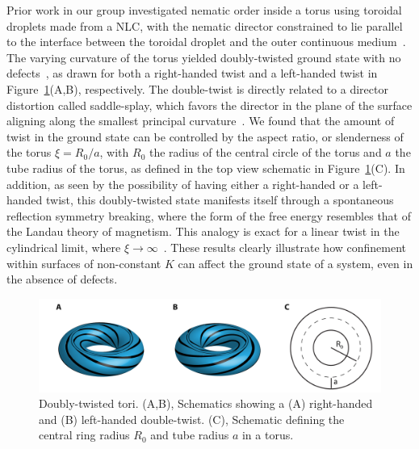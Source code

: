 Prior work in our group investigated nematic order inside a torus using toroidal droplets made from a NLC, with the nematic director constrained to lie parallel to the interface between the toroidal droplet and the outer continuous medium~\cite{RN24,RN47}.
The varying curvature of the torus yielded doubly-twisted ground state with no defects~\cite{RN24}, as drawn for both a right-handed twist and a left-handed twist in Figure~\ref{f:1-Torus}(A,B), respectively.
The double-twist is directly related to a director distortion called saddle-splay, which favors the director in the plane of the surface aligning along the smallest principal curvature~\cite{RN59}.
We found that the amount of twist in the ground state can be controlled by the aspect ratio, or slenderness of the torus $\xi = R_0/a$, with $R_0$ the radius of the central circle of the torus and $a$ the tube radius of the torus, as defined in the top view schematic in Figure~\ref{f:1-Torus}(C).
In addition, as seen by the possibility of having either a right-handed or a left-handed twist, this doubly-twisted state manifests itself through a spontaneous reflection symmetry breaking, where the form of the free energy resembles that of the Landau theory of magnetism.
This analogy is exact for a linear twist in the cylindrical limit, where $\xi \rightarrow \infty$~\cite{RN293}.
These results clearly illustrate how confinement within surfaces of non-constant $K$ can affect the ground state of a system, even in the absence of defects.
\begin{figure}
  \centering
  \includegraphics{figures/C1/Ch1-Figs_Torus.png}
  \caption{Doubly-twisted tori.
  (A,B), Schematics showing a (A) right-handed and (B) left-handed double-twist.
  (C), Schematic defining the central ring radius $R_0$ and tube radius $a$ in a torus.}\label{f:1-Torus}
\end{figure}

